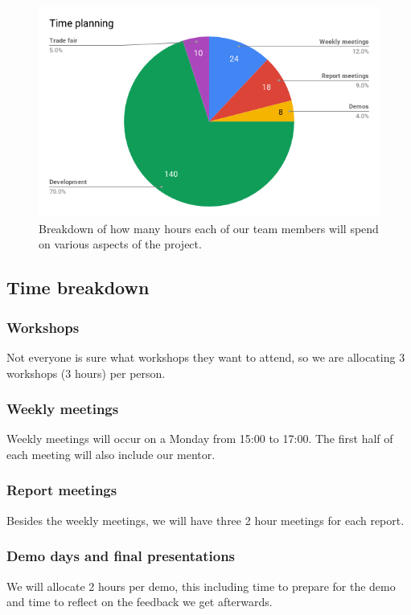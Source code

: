 \documentclass[onecolumn]{IEEEtran}
\begin{document}
\begin{figure}
    \centering
    \includegraphics[width=0.8\linewidth]{images/time.png}
    \caption{Breakdown of how many hours each of our team members will spend on various aspects of the project.}
\end{figure}

\subsection{Time breakdown}

\subsubsection{Workshops}

Not everyone is sure what workshops they want to attend, so we are allocating 3 workshops (3 hours) per person.

\subsubsection{Weekly meetings}

Weekly meetings will occur on a Monday from 15:00 to 17:00. The first half of each meeting will also include our mentor.

\subsubsection{Report meetings}

Besides the weekly meetings, we will have three 2 hour meetings for each report.

\subsubsection{Demo days and final presentations}

We will allocate 2 hours per demo, this including time to prepare for the demo and time to reflect on the feedback we get afterwards.
\end{document}
